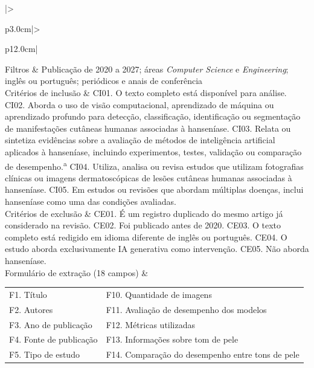 \begin{longtable}{|>{\raggedright\arraybackslash}p{3.0cm}|>{\raggedright\arraybackslash}p{12.0cm}|}
	\hline
	Filtros & Publicação de 2020 a 2027; áreas \textit{Computer Science} e \textit{Engineering}; inglês ou português; periódicos e anais de conferência \\
	\hline
	Critérios de inclusão &
	CI01. O texto completo está disponível para análise.\newline
	CI02. Aborda o uso de visão computacional, aprendizado de máquina ou aprendizado profundo para detecção, classificação, identificação ou segmentação de manifestações cutâneas humanas associadas à hanseníase.\newline
	CI03. Relata ou sintetiza evidências sobre a avaliação de métodos de inteligência artificial aplicados à hanseníase, incluindo experimentos, testes, validação ou comparação de desempenho.\textsuperscript{a}\newline
	CI04. Utiliza, analisa ou revisa estudos que utilizam fotografias clínicas ou imagens dermatoscópicas de lesões cutâneas humanas associadas à hanseníase.\newline
	CI05. Em estudos ou revisões que abordam múltiplas doenças, inclui hanseníase como uma das condições avaliadas. \\
	\hline
	Critérios de exclusão &
	CE01. É um registro duplicado do mesmo artigo já considerado na revisão.\newline
	CE02. Foi publicado antes de 2020.\newline
	CE03. O texto completo está redigido em idioma diferente de inglês ou português.\newline
	CE04. O estudo aborda exclusivamente IA generativa como intervenção.\newline
	CE05. Não aborda hanseníase. \\
	\hline
	Formulário de extração (18 campos) &
	\begin{tabular}[t]{@{}p{5.9cm}p{5.9cm}@{}}
		F1. Título                                      & F10. Quantidade de imagens                     \\
		F2. Autores                                     & F11. Avaliação de desempenho dos modelos        \\
		F3. Ano de publicação                           & F12. Métricas utilizadas                        \\
		F4. Fonte de publicação                         & F13. Informações sobre tom de pele              \\
		F5. Tipo de estudo                              & F14. Comparação do desempenho entre tons de pele \\

\end{tabular}
\end{longtable}
